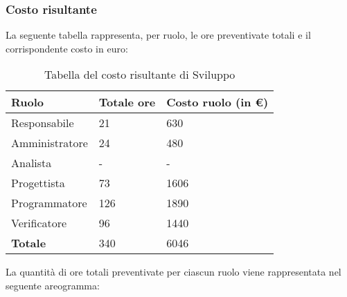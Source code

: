 




\subsubsection{Costo risultante}
La seguente tabella rappresenta, per ruolo, le ore preventivate totali e il corrispondente costo in euro:
{
\renewcommand{\arraystretch}{2}
\begin{longtable}{ C{3cm} C{2cm} C{4cm}}
\caption{Tabella del costo risultante di Sviluppo}\\
\rowcolor{\primaryColor}

\textcolor{\secondaryColor}{\textbf{Ruolo}} & 
\textcolor{\secondaryColor}{\textbf{Totale ore}} & 
\textcolor{\secondaryColor}{\textbf{Costo ruolo (in \euro{})}}\\	
\endhead
        
Responsabile    & 21 & 630 \\
Amministratore  & 24 & 480 \\
Analista        & - & - \\
Progettista     & 73 & 1606 \\
Programmatore   & 126 & 1890 \\
Verificatore    & 96 & 1440 \\
\textbf{Totale} & 340 & 6046 \\
		
\end{longtable}
}


\vskip 30pt %
La quantità di ore totali preventivate per ciascun ruolo viene rappresentata nel seguente areogramma:
\begin{center}
\end{center}